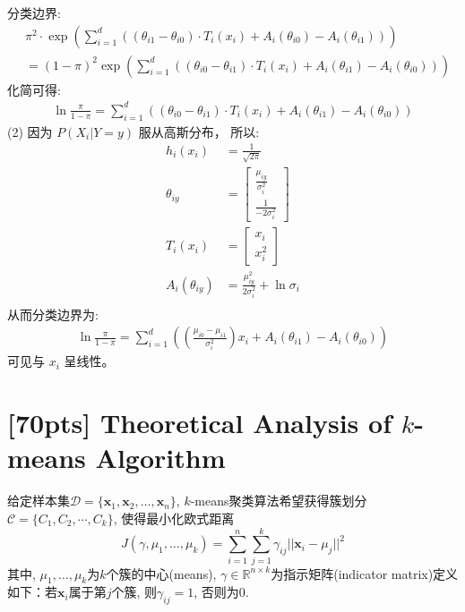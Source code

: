 \documentclass[a4paper,UTF8]{article}
\numberwithin{equation}{section}
\theoremstyle{definition}
\begin{document}
分类边界:  %
\begin{equation}
\begin{split}
&\pi ^ 2 \cdot \exp (\sum_{i=1}^d( (\theta_{i1} - \theta_{i0})\cdot T_i(x_i)  + A_{i}(\theta_{i0}) -A_{i}(\theta_{i1})))   \\
&= (1-\pi)^2 \exp (\sum_{i=1}^d( (\theta_{i0} - \theta_{i1})\cdot T_i(x_i)  + A_{i}(\theta_{i1}) -A_{i}(\theta_{i0})))
\end{split}
\end{equation}
化简可得: 
\begin{equation}
\begin{split}
\ln \frac{\pi}{1-\pi}  = \sum_{i=1}^d( (\theta_{i0} - \theta_{i1})\cdot T_i(x_i)  + A_{i}(\theta_{i1}) - A_{i}(\theta_{i0}))
\end{split}
\end{equation}
(2) %
因为 $P(X_i | Y=y)$ 服从高斯分布， 所以: 
\begin{equation}
\begin{split}
h_i(x_i) &= \frac{1}{\sqrt{2\pi}} \\
 \theta_{iy} &= \begin{bmatrix} \frac{\mu_{iy}}{\sigma_i^2} \\ \frac{1}{-2\sigma_i^2} \end{bmatrix}     \\
 T_{i}(x_i) &= \begin{bmatrix} x_i \\ x_i^2 \end{bmatrix} \\
 A_{i}(\theta_{iy}) &=  \frac{\mu_{iy}^2}{2\sigma_i^2} +  \ln \sigma_i  \\
\end{split}
\end{equation}
从而分类边界为: 
\begin{equation}
\begin{split}
\ln \frac{\pi}{1-\pi}  = \sum_{i=1}^d( (\frac{\mu_{i0}- \mu_{i1}}{\sigma_i^2})x_i  + A_{i}(\theta_{i1}) - A_{i}(\theta_{i0}))
\end{split}
\end{equation}
可见与 $x_i $ 呈线性。

\newpage
\section{[70pts] Theoretical Analysis of $k$-means Algorithm} %
给定样本集$\mathcal{D} = \{ \mathbf x_1,\mathbf x_2, \ldots, \mathbf x_n \}$, $k$-means聚类算法希望获得簇划分$\mathcal{C}=\{C_1,C_2,\cdots,C_k\}$, 使得最小化欧式距离
\begin{equation}
\label{eq-kmeans-l2}
J(\gamma, \mu_1,\ldots,\mu_k) = \sum_{i=1}^n \sum_{j=1}^k \gamma_{ij}||\mathbf x_i - \mu_j||^2
\end{equation} 
其中, $\mu_1, \ldots, \mu_k$为$k$个簇的中心(means), $\gamma \in \mathbb{R}^{n\times k}$为指示矩阵(indicator matrix)定义如下：若$\mathbf x_i$属于第$j$个簇, 则$\gamma_{ij} = 1$, 否则为0. 
\end{document}
